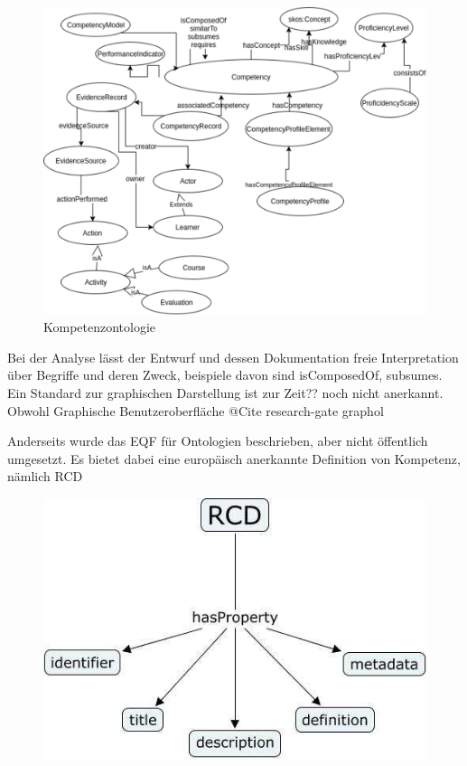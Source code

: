 \documentclass[
12pt,
english,
ngerman,
headsepline,
twoside,
openright,
numbers=noenddot,version=first
]{scrreprt}
\begin{document}
\begin{figure}[h]
	\centering
	\includegraphics[angle=270]{pics/competency-ontology.eps}
	\caption{Kompetenzontologie}
	\label{fig:competence-ontology}
\end{figure}

Bei der Analyse lässt der Entwurf und dessen Dokumentation freie Interpretation über Begriffe und deren Zweck, beispiele davon sind \glqq isComposedOf\grqq, \glqq subsumes\grqq. Ein Standard zur graphischen Darstellung ist zur Zeit?? noch nicht anerkannt. Obwohl Graphische Benutzeroberfläche  @Cite research-gate graphol

Anderseits wurde das \acrshort{EQF} für Ontologien beschrieben, aber nicht öffentlich umgesetzt. Es bietet dabei eine europäisch anerkannte Definition von Kompetenz, nämlich RCD\cite{eqfCompetency}


\begin{figure}
	\includegraphics[width=0.9\linewidth]{pics/RCD.jpg}
\end{figure}
\end{document}
